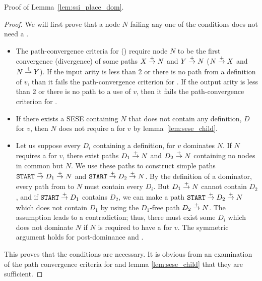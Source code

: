 \noindent
Proof of Lemma~\ref{lem:ssi_place_dom}.
\begin{proof}
We will first prove that a node $N$ failing any one of the conditions does
not need a \phisigfunction[or].
\begin{itemize}
\item The path-convergence criteria for  ()
require node $N$ to be the first convergence
(divergence) of some paths $X \stackrel{+}{\rightarrow} N$ and $Y \stackrel{+}{\rightarrow} N$ ($N
\stackrel{+}{\rightarrow} X$ and $N \stackrel{+}{\rightarrow} Y$).  If the input arity is less than 2
or there is no path from a definition of $v$, than it fails the
path-convergence criterion for .  If the output arity
is less than 2 or there is no path to a use of $v$, then it fails the
path-convergence criterion for .
\item If there exists a SESE containing $N$ that does not contain any
definition, \phisigfunction[or]{} $D$ for $v$, then $N$ does not require a
\phisigfunction[or]{} for $v$ by lemma~\ref{lem:sese_child}.
\item Let us suppose every $D_i$ containing a definition,
\phisigfunction[or]{} for $v$ dominates $N$.  If $N$ requires a
\phifunction for $v$,  there exist paths $D_1 \stackrel{+}{\rightarrow} N$ and
$D_2 \stackrel{+}{\rightarrow} N$ containing no nodes in common but $N$.  We use these
paths to construct simple paths $\texttt{START}\stackrel{+}{\rightarrow} D_1 \stackrel{+}{\rightarrow} N$ and
$\texttt{START}\stackrel{+}{\rightarrow} D_2 \stackrel{+}{\rightarrow} N$.  By the definition of a
dominator, every path from  to $N$ must contain every
$D_i$.  But $D_1 \stackrel{+}{\rightarrow} N$ cannot contain $D_2$, and if
$\texttt{START} \stackrel{+}{\rightarrow} D_1$ contains $D_2$, we can make a path
$\texttt{START} \stackrel{+}{\rightarrow} D_2 \stackrel{+}{\rightarrow} N$ which does not contain $D_1$
by using the $D_1$-free path $D_2 \stackrel{+}{\rightarrow} N$.  The assumption leads
to a contradiction; thus, there must exist some $D_i$ which does not
dominate $N$ if $N$ is required to have a \phifunction for $v$.  The
symmetric argument holds for post-dominance and .
\end{itemize}
This proves that the conditions are necessary.  It is obvious from an
examination of the path convergence criteria for 
and lemma \ref{lem:sese_child} that they are sufficient.
\end{proof}

